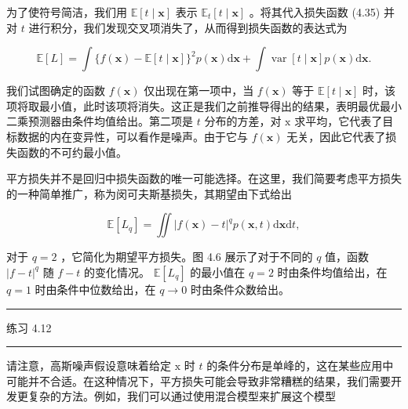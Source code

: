 \documentclass[10pt]{article}
\newcommand{\HRule}{\begin{center}\rule{0.9\linewidth}{0.2mm}\end{center}}
\begin{document}
为了使符号简洁，我们用 \(\mathbb{E}\left\lbrack  {t \mid  \mathbf{x}}\right\rbrack\) 表示 \({\mathbb{E}}_{t}\left\lbrack  {t \mid  \mathbf{x}}\right\rbrack\) 。将其代入损失函数 (4.35) 并对 \(t\) 进行积分，我们发现交叉项消失了，从而得到损失函数的表达式为

\[
\mathbb{E}\left\lbrack  L\right\rbrack   = \int \{ f\left( \mathbf{x}\right)  - \mathbb{E}\left\lbrack  {t \mid  \mathbf{x}}\right\rbrack  {\} }^{2}p\left( \mathbf{x}\right) \mathrm{d}\mathbf{x} + \int \operatorname{var}\left\lbrack  {t \mid  \mathbf{x}}\right\rbrack  p\left( \mathbf{x}\right) \mathrm{d}\mathbf{x}. \tag{4.39}
\]

我们试图确定的函数 \(f\left( \mathbf{x}\right)\) 仅出现在第一项中，当 \(f\left( \mathbf{x}\right)\) 等于 \(\mathbb{E}\left\lbrack  {t \mid  \mathbf{x}}\right\rbrack\) 时，该项将取最小值，此时该项将消失。这正是我们之前推导得出的结果，表明最优最小二乘预测器由条件均值给出。第二项是 \(t\) 分布的方差，对 \(\mathrm{x}\) 求平均，它代表了目标数据的内在变异性，可以看作是噪声。由于它与 \(f\left( \mathbf{x}\right)\) 无关，因此它代表了损失函数的不可约最小值。

平方损失并不是回归中损失函数的唯一可能选择。在这里，我们简要考虑平方损失的一种简单推广，称为闵可夫斯基损失，其期望由下式给出

\[
\mathbb{E}\left\lbrack  {L}_{q}\right\rbrack   = \iint {\left| f\left( \mathbf{x}\right)  - t\right| }^{q}p\left( {\mathbf{x},t}\right) \mathrm{d}\mathbf{x}\mathrm{d}t, \tag{4.40}
\]

对于 \(q = 2\) ，它简化为期望平方损失。图 4.6 展示了对于不同的 \(q\) 值，函数 \({\left| f - t\right| }^{q}\) 随 \(f - t\) 的变化情况。 \(\mathbb{E}\left\lbrack  {L}_{q}\right\rbrack\) 的最小值在 \(q = 2\) 时由条件均值给出，在 \(q = 1\) 时由条件中位数给出，在 \(q \rightarrow  0\) 时由条件众数给出。

\HRule

练习 4.12

\HRule

请注意，高斯噪声假设意味着给定 \(\mathrm{x}\) 时 \(t\) 的条件分布是单峰的，这在某些应用中可能并不合适。在这种情况下，平方损失可能会导致非常糟糕的结果，我们需要开发更复杂的方法。例如，我们可以通过使用混合模型来扩展这个模型
\end{document}
